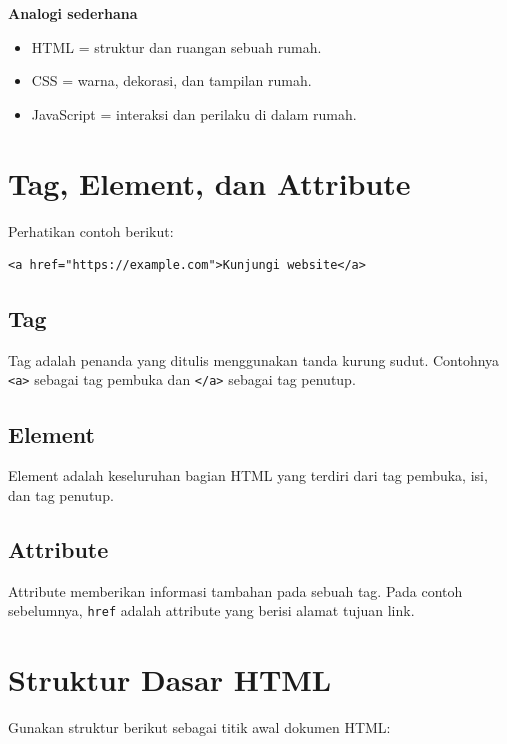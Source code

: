 \documentclass[11pt,a4paper]{article}
\begin{document}
\begin{conceptbox}
\textbf{Analogi sederhana}

\begin{itemize}
    \item HTML = struktur dan ruangan sebuah rumah.
    \item CSS = warna, dekorasi, dan tampilan rumah.
    \item JavaScript = interaksi dan perilaku di dalam rumah.
\end{itemize}
\end{conceptbox}

\section{Tag, Element, dan Attribute}

Perhatikan contoh berikut:

\begin{lstlisting}[style=htmlstyle]
<a href="https://example.com">Kunjungi website</a>
\end{lstlisting}

\subsection{Tag}

Tag adalah penanda yang ditulis menggunakan tanda kurung sudut. Contohnya \texttt{<a>} sebagai tag pembuka dan \texttt{</a>} sebagai tag penutup.

\subsection{Element}

Element adalah keseluruhan bagian HTML yang terdiri dari tag pembuka, isi, dan tag penutup.

\subsection{Attribute}

Attribute memberikan informasi tambahan pada sebuah tag. Pada contoh sebelumnya, \texttt{href} adalah attribute yang berisi alamat tujuan link.

\section{Struktur Dasar HTML}

Gunakan struktur berikut sebagai titik awal dokumen HTML:
\end{document}
